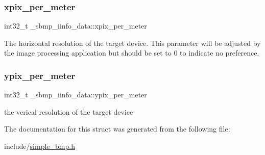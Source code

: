 \subsubsection{\texorpdfstring{xpix\+\_\+per\+\_\+meter}{xpix\_per\_meter}}
{\footnotesize\ttfamily int32\+\_\+t \+\_\+sbmp\+\_\+iinfo\+\_\+data\+::xpix\+\_\+per\+\_\+meter}

The horizontal resolution of the target device. This parameter will be adjusted by the image processing application but should be set to \textquotesingle{}0\textquotesingle{} to indicate no preference. \mbox{\label{struct__sbmp__iinfo__data_adee64a3daa366c744c5c6a2b860e15ef}} 
\subsubsection{\texorpdfstring{ypix\+\_\+per\+\_\+meter}{ypix\_per\_meter}}
{\footnotesize\ttfamily int32\+\_\+t \+\_\+sbmp\+\_\+iinfo\+\_\+data\+::ypix\+\_\+per\+\_\+meter}



the verical resolution of the target device 



The documentation for this struct was generated from the following file\+:\begin{DoxyCompactItemize}
\item 
include/\hyperlink{simple__bmp_8h}{simple\+\_\+bmp.\+h}\end{DoxyCompactItemize}

